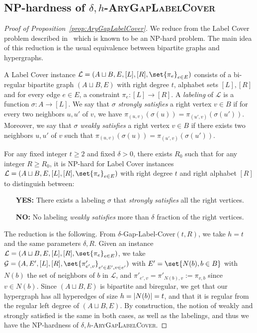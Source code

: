 \subsection{\textrm{NP}-hardness of $\delta,h$-\textsc{AryGapLabelCover}}
\label{app:NPhardnessGap}
\begin{proof}[Proof of Proposition~\ref{prop:AryGapLabelCover}]
  We reduce from the Label Cover problem described in~\cite{DMMS20} which is known to be an \textrm{NP}-hard problem. The main idea of this reduction is the usual equivalence between bipartite graphs and hypergraphs.

  \begin{definition}
    A Label Cover instance $\mathcal{L} = (A \sqcup B,E,[L],[R],\set{\pi_e}_{e \in E})$ consists of a bi-regular bipartite graph $(A \sqcup B,E)$ with right degree $t$, alphabet sets $[L],[R]$ and for every edge $e \in E$, a constraint $\pi_e :[L] \rightarrow [R]$.
    A \emph{labeling} of $\mathcal{L}$ is a function $\sigma : A \rightarrow [L]$. We say that $\sigma$ \emph{strongly satisfies} a right vertex $v \in B$ if for every two neighbors $u,u'$ of $v$, we have $\pi_{(u,v)}(\sigma(u)) = \pi_{(u',v)}(\sigma(u'))$. Moreover, we say that  $\sigma$ \emph{weakly satisfies} a right vertex $v \in B$ if there exists two neighbors $u,u'$ of $v$ such that $\pi_{(u,v)}(\sigma(u)) = \pi_{(u',v)}(\sigma(u'))$.
  \end{definition}

 \begin{theorem}
  For any fixed integer $t \geq 2$ and fixed $\delta > 0$, there exists $R_0$ such that for any integer $R \geq R_0$, it is \textrm{NP}-hard for Label Cover instances $\mathcal{L} = (A \sqcup B,E,[L],[R],\set{\pi_e}_{e \in E})$ with right degree $t$ and right alphabet $[R]$ to distinguish between:
  
  \begin{itemize}
  \item[\textbf{YES:}] There exists a labeling $\sigma$ that \emph{strongly satisfies} all the right vertices.
  \item[\textbf{NO:}] No labeling \emph{weakly satisfies} more than $\delta$ fraction of the right vertices.
  \end{itemize}
\end{theorem}

 The reduction is the following. From $\delta$-Gap-Label-Cover$(t,R)$, we take $h=t$ and the same parameters $\delta,R$. Given an instance $\mathcal{L} = (A \sqcup B,E,[L],[R],\set{\pi_e}_{e \in E})$, we take $\mathcal{G} = (A,E',[L],[R],\set{\pi'_{e',v}}_{e' \in E',v \in e'})$ with $E' = \set{N(b), b \in B}$ with $N(b)$ the set of neighbors of $b$ in $\mathcal{L}$, and $\pi'_{e',v} = \pi'_{N(b),v} := \pi_{v,b}$ since $v \in N(b)$. Since $(A \sqcup B,E)$ is bipartite and biregular, we get that our hypergraph has all hyperedges of size $h = \abs{N(b)} = t$, and that it is regular from the regular left degree of $(A \sqcup B,E)$. By construction, the notion of weakly and strongly satisfied is the same in both cases, as well as the labelings, and thus we have the \textrm{NP}-hardness of $\delta,h$-\textsc{AryGapLabelCover}.


\end{proof}
